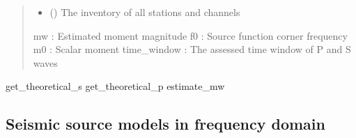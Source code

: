 \documentclass[letterpaper,10pt,english]{sphinxmanual}
\begin{document}
\begin{fulllineitems}
\begin{quote}
\begin{description}
\begin{itemize}
\item {} 
\sphinxAtStartPar
{} () \textendash{} The inventory of all stations and channels

\end{itemize}

\sphinxAtStartPar
mw : Estimated moment magnitude
f0 : Source function corner frequency
m0 : Scalar moment
time\_window : The assessed time window of P and S waves

\end{description}\end{quote}
\begin{description}
\sphinxAtStartPar
get\_theoretical\_s
get\_theoretical\_p
estimate\_mw

\end{description}

\end{fulllineitems}


\subsection{Seismic source models in frequency domain}
\label{\detokenize{api_support:seismic-source-models-in-frequency-domain}}\label{\detokenize{api_support:module-amw.mw.source_models}}
\end{document}
